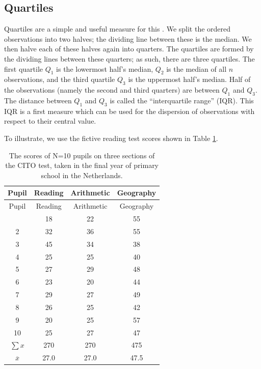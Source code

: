 \documentclass[
]{book}
\begin{document}
\hypertarget{quartiles}{%
\subsection{Quartiles}\label{quartiles}}

Quartiles are a simple and useful measure for this \citep{Tukey77}.
We split the ordered observations into two halves; the dividing line
between these is the median. We then halve each of these halves again into quarters.
The quartiles are formed by the dividing lines between these
quarters; as such, there are three quartiles. The first quartile \(Q_1\) is the lowermost half's median,
\(Q_2\) is the median of all \(n\) observations, and the third quartile \(Q_3\) is the uppermost half's median.
Half of the observations (namely the second and third quarters) are
between \(Q_1\) and \(Q_3\). The distance between \(Q_1\) and \(Q_3\) is
called the ``interquartile range'' (IQR). This IQR is a first measure which
can be used for the dispersion of observations with respect to their
central value.

To illustrate, we use the fictive reading test scores shown in Table
\ref{tab:cito}.

\begin{longtable}[]{@{}cccc@{}}
\caption{\label{tab:cito} The scores of N=10 pupils on three sections of the CITO test,
taken in the final year of primary school in the Netherlands.}\tabularnewline
\toprule\noalign{}
Pupil & Reading & Arithmetic & Geography \\
\midrule\noalign{}
\endfirsthead
\toprule\noalign{}
Pupil & Reading & Arithmetic & Geography \\
\midrule\noalign{}
\endhead
\bottomrule\noalign{}
\endlastfoot
1 & 18 & 22 & 55 \\
2 & 32 & 36 & 55 \\
3 & 45 & 34 & 38 \\
4 & 25 & 25 & 40 \\
5 & 27 & 29 & 48 \\
6 & 23 & 20 & 44 \\
7 & 29 & 27 & 49 \\
8 & 26 & 25 & 42 \\
9 & 20 & 25 & 57 \\
10 & 25 & 27 & 47 \\
\(\sum x\) & 270 & 270 & 475 \\
\(\overline{x}\) & 27.0 & 27.0 & 47.5 \\
\end{longtable}
\end{document}
